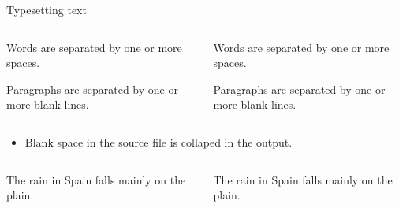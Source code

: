 \documentclass[,aspectratio=43]{beamer}
\newcommand{\VERB}{\Verb[commandchars=\\\{\}]}
\newenvironment{Shaded}{\begin{snugshade}}{\end{snugshade}}
\newcommand{\ExtensionTok}[1]{#1}
\newcommand{\KeywordTok}[1]{\textcolor[rgb]{0.00,0.44,0.13}{\textbf{#1}}}
\newcommand{\NormalTok}[1]{#1}
\providecommand{\tightlist}{%
  \setlength{\itemsep}{0pt}\setlength{\parskip}{0pt}}
\begin{document}
\begin{frame}[fragile]{Typesetting text}
\protect\hypertarget{typesetting-text}{}

\begin{columns}[T]
\begin{column}{0.48\textwidth}
\vspace{-1em}

\begin{Shaded}
\begin{Highlighting}[]
\NormalTok{Words are separated by one}
\NormalTok{or more spaces.}

\NormalTok{Paragraphs are separated by}
\NormalTok{one or more blank lines.}
\end{Highlighting}
\end{Shaded}
\end{column}

\begin{column}{0.48\textwidth}
Words are separated by one or more spaces.

\hfill\break

Paragraphs are separated by one or more blank lines.
\end{column}
\end{columns}

\vspace{0.5em}

\begin{itemize}
\tightlist
\item
  Blank space in the source file is collaped in the output.
\end{itemize}

\begin{columns}[T]
\begin{column}{0.48\textwidth}
\vspace{-1em}

\begin{Shaded}
\begin{Highlighting}[]
\NormalTok{The      rain    in   Spain}
\NormalTok{falls mainly on the   plain.}
\end{Highlighting}
\end{Shaded}
\end{column}

\begin{column}{0.48\textwidth}
The rain in Spain falls mainly on the plain.
\end{column}
\end{columns}
\end{frame}
\end{document}
